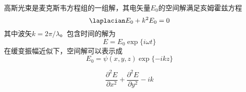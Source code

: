 

高斯光束是麦克斯韦方程组的一组解，其电矢量$E_0$的空间解满足亥姆霍兹方程
\begin{equation}
\laplacian E_0 + k^2E_0=0
\end{equation}
其中波矢$k=2\pi/\lambda$。包含时间的解为
\begin{equation}
E=E_0\exp\{i\omega t\}
\end{equation}
在缓变振幅近似下，空间解可以表示成
\begin{equation}
E_0=\psi(x,y,z)\exp\{-ikz\}
\end{equation}


\begin{equation}
\frac{\partial^2 E}{\partial x^2} +\frac{\partial^2 E}{\partial y^2} -ik 
\end{equation}
